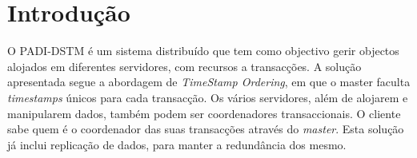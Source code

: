 \section{Introdução}

O PADI-DSTM é um sistema distribuído que tem como objectivo gerir objectos alojados em diferentes servidores, com recursos a transacções. A solução apresentada segue a abordagem de \textit{TimeStamp Ordering}, em que o master faculta \textit{timestamps} únicos para cada transacção. Os vários servidores, além de alojarem e manipularem dados, também podem ser coordenadores transaccionais. O cliente sabe quem é o coordenador das suas transacções através do \textit{master}. Esta solução já inclui replicação de dados, para manter a redundância dos mesmo.